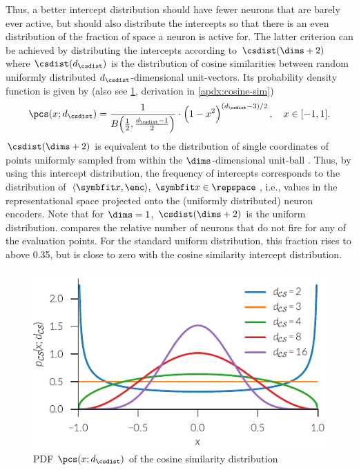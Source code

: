 Thus, a better intercept distribution should have fewer neurons that are barely ever active, but should also distribute the intercepts so that there is an even distribution of the fraction of space a neuron is active for.
The latter criterion can be achieved by distributing the intercepts according to $\csdist(\dims+2)$ where $\csdist(d_{\csdist})$ is the distribution of cosine similarities between random uniformly distributed $d_{\csdist}$-dimensional unit-vectors.
Its probability density function is given by (also see \cref{fig:cosine-sim}, derivation in \cref{apdx:cosine-sim})
\begin{equation}
\pcs(x; d_{\csdist}) = \frac{1}{B\!\del{\frac{1}{2}, \frac{d_{\csdist} - 1}{2}}} \cdot \del{1 - x^2}^{\del{d_{\csdist} - 3} / 2},\quad x \in [-1, 1] \text{.}\label{eqn:pcs}
\end{equation}
$\csdist(\dims+2)$ is equivalent to the distribution of single coordinates of points uniformly sampled from within the $\dims$-dimensional unit-ball \parencite{voelker2017}.
Thus, by using this intercept distribution, the frequency of intercepts corresponds to the distribution of $\langle \vc x, \enc \rangle,\ \vc x \in \repspace$, i.e., values in the representational space projected onto the (uniformly distributed) neuron encoders.
Note that for $\dims = 1$, $\csdist(\dims + 2)$ is the uniform distribution.
 compares the relative number of neurons that do not fire for any of the evaluation points.
For the standard uniform distribution, this fraction rises to above \num{0.35}, but is close to zero with the cosine similarity intercept distribution.
\begin{figure}
    \centering
    \includegraphics{figures/cosine-sim}
    \caption{PDF $\pcs(x; d_{\csdist})$ of the cosine similarity distribution}\label{fig:cosine-sim}
\end{figure}
